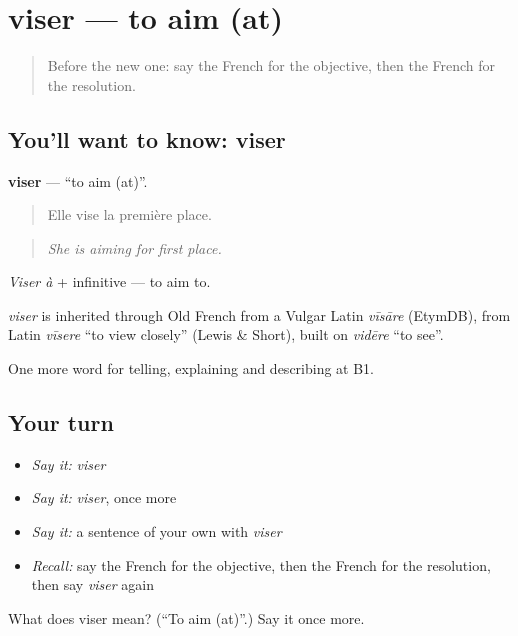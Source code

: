 \section[viser]{viser — to aim (at)}

\label{lesson:FR-C374-viser}



\begin{quote}
Before the new one: say the French for the objective, then the French for the resolution.
\end{quote}

\subsection*{You'll want to know: viser}
\textbf{viser} — \textquotedblleft{}to aim (at)\textquotedblright{}.

\begin{quote}
Elle vise la première place.
\end{quote}

\begin{quote}
\emph{She is aiming for first place.}
\end{quote}

\emph{Viser à} + infinitive — to aim to.

\begin{cousinweb}
\emph{viser} is inherited through Old French from a Vulgar Latin \emph{vīsāre} (EtymDB), from Latin \emph{vīsere} \textquotedblleft{}to view closely\textquotedblright{} (Lewis \& Short), built on \emph{vidēre} \textquotedblleft{}to see\textquotedblright{}.
\end{cousinweb}

\begin{grammarlens}[title={What you've built}]
One more word for telling, explaining and describing at B1.
\end{grammarlens}

\subsection*{Your turn}
\begin{itemize}
\raggedright
  \item \emph{Say it:} \emph{viser}
  \item \emph{Say it:} \emph{viser}, once more
  \item \emph{Say it:} a sentence of your own with \emph{viser}
  \item \emph{Recall:} say the French for the objective, then the French for the resolution, then say \emph{viser} again
\end{itemize}

\begin{tcolorbox}[breakable,colback=teal!4,colframe=teal!35!black,title={Before you move on}]
What does viser mean? (\textquotedblleft{}To aim (at)\textquotedblright{}.) Say it once more.
\end{tcolorbox}
